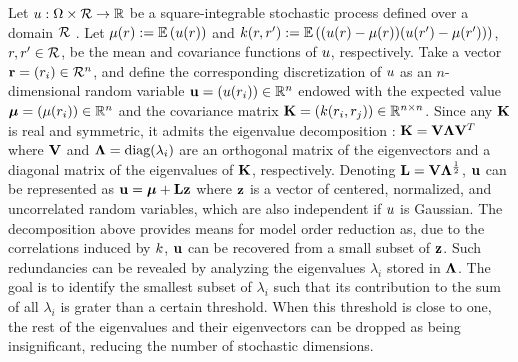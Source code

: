 Let $u: \Omega \times \mathcal{R} \to \mathbb{R}$ be a square-integrable stochastic process defined over a domain $\mathcal{R}$ \cite{durrett2010}. Let $\fMean{\r} := \E{\u(\r)}$ and $\fCov{\r, \r'} := \E{(\u(\r) - \fMean{\r}) (\u(\r') - \fMean{\r'})}$, $r, r' \in \mathcal{R}$, be the mean and covariance functions of $u$, respectively. Take a vector $\mathbf{r} = (r_i) \in \mathcal{R}^n$, and define the corresponding discretization of $u$ as an $n$-dimensional random variable $\mathbf{u} = (u(r_i)) \in \mathbb{R}^n$ endowed with the expected value $\vmean = (\fMean{\r_i}) \in \real^n$ and the covariance matrix $\mCov = (\fCov{\r_i, \r_j}) \in \real^{n \times n}$. Since any $\mathbf{K}$ is real and symmetric, it admits the eigenvalue decomposition \cite{press2007}: $\mathbf{K} = \mathbf{V} \mathbf{\Lambda} \mathbf{V}^T$ where $\mathbf{V}$ and $\mathbf{\Lambda} = \text{diag}(\lambda_i)$ are an orthogonal matrix of the eigenvectors and a diagonal matrix of the eigenvalues of $\mathbf{K}$, respectively. Denoting $\mathbf{L} = \mathbf{V} \mathbf{\Lambda}^\frac{1}{2}$, $\mathbf{u}$ can be represented as $\mathbf{u} = {\boldsymbol\mu} + \mathbf{L} \mathbf{z}$ where $\mathbf{z}$ is a vector of centered, normalized, and uncorrelated random variables, which are also independent if $u$ is Gaussian.
The decomposition above provides means for model order reduction as, due to the correlations induced by $\fCov$, $\mathbf{u}$ can be recovered from a small subset of $\mathbf{z}$. Such redundancies can be revealed by analyzing the eigenvalues $\lambda_i$ stored in $\mathbf{\Lambda}$.
The goal is to identify the smallest subset of $\lambda_i$ such that its contribution to the sum of all $\lambda_i$ is grater than a certain threshold.
When this threshold is close to one, the rest of the eigenvalues and their eigenvectors can be dropped as being insignificant, reducing the number of stochastic dimensions.
